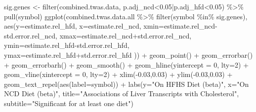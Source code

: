 \documentclass[
]{article}
\newenvironment{Shaded}{\begin{snugshade}}{\end{snugshade}}
\newcommand{\AttributeTok}[1]{\textcolor[rgb]{0.77,0.63,0.00}{#1}}
\newcommand{\DecValTok}[1]{\textcolor[rgb]{0.00,0.00,0.81}{#1}}
\newcommand{\FloatTok}[1]{\textcolor[rgb]{0.00,0.00,0.81}{#1}}
\newcommand{\FunctionTok}[1]{\textcolor[rgb]{0.00,0.00,0.00}{#1}}
\newcommand{\NormalTok}[1]{#1}
\newcommand{\OtherTok}[1]{\textcolor[rgb]{0.56,0.35,0.01}{#1}}
\newcommand{\SpecialCharTok}[1]{\textcolor[rgb]{0.00,0.00,0.00}{#1}}
\newcommand{\StringTok}[1]{\textcolor[rgb]{0.31,0.60,0.02}{#1}}
\begin{document}
\begin{Shaded}
\begin{Highlighting}[]
\NormalTok{sig.genes }\OtherTok{\textless{}{-}} \FunctionTok{filter}\NormalTok{(combined.twas.data, p.adj\_ncd}\SpecialCharTok{\textless{}}\FloatTok{0.05}\SpecialCharTok{|}\NormalTok{p.adj\_hfd}\SpecialCharTok{\textless{}}\FloatTok{0.05}\NormalTok{) }\SpecialCharTok{\%\textgreater{}\%} \FunctionTok{pull}\NormalTok{(symbol)}
\FunctionTok{ggplot}\NormalTok{(combined.twas.data.all }\SpecialCharTok{\%\textgreater{}\%} \FunctionTok{filter}\NormalTok{(symbol }\SpecialCharTok{\%in\%}\NormalTok{ sig.genes), }
       \FunctionTok{aes}\NormalTok{(}\AttributeTok{y=}\NormalTok{estimate.rel\_hfd, }\AttributeTok{x=}\NormalTok{estimate.rel\_ncd,}
           \AttributeTok{xmin=}\NormalTok{estimate.rel\_ncd}\SpecialCharTok{{-}}\NormalTok{std.error.rel\_ncd,}
           \AttributeTok{xmax=}\NormalTok{estimate.rel\_ncd}\SpecialCharTok{+}\NormalTok{std.error.rel\_ncd,}
           \AttributeTok{ymin=}\NormalTok{estimate.rel\_hfd}\SpecialCharTok{{-}}\NormalTok{std.error.rel\_hfd,}
           \AttributeTok{ymax=}\NormalTok{estimate.rel\_hfd}\SpecialCharTok{+}\NormalTok{std.error.rel\_hfd )) }\SpecialCharTok{+}
  \FunctionTok{geom\_point}\NormalTok{() }\SpecialCharTok{+}
  \FunctionTok{geom\_errorbar}\NormalTok{() }\SpecialCharTok{+}
  \FunctionTok{geom\_errorbarh}\NormalTok{() }\SpecialCharTok{+}
  \FunctionTok{geom\_smooth}\NormalTok{() }\SpecialCharTok{+}
  \FunctionTok{geom\_hline}\NormalTok{(}\AttributeTok{yintercept =} \DecValTok{0}\NormalTok{, }\AttributeTok{lty=}\DecValTok{2}\NormalTok{) }\SpecialCharTok{+}
  \FunctionTok{geom\_vline}\NormalTok{(}\AttributeTok{xintercept =} \DecValTok{0}\NormalTok{, }\AttributeTok{lty=}\DecValTok{2}\NormalTok{) }\SpecialCharTok{+}
  \FunctionTok{xlim}\NormalTok{(}\SpecialCharTok{{-}}\FloatTok{0.03}\NormalTok{,}\FloatTok{0.03}\NormalTok{) }\SpecialCharTok{+}
  \FunctionTok{ylim}\NormalTok{(}\SpecialCharTok{{-}}\FloatTok{0.03}\NormalTok{,}\FloatTok{0.03}\NormalTok{) }\SpecialCharTok{+}
  \FunctionTok{geom\_text\_repel}\NormalTok{(}\FunctionTok{aes}\NormalTok{(}\AttributeTok{label=}\NormalTok{symbol)) }\SpecialCharTok{+}
  \FunctionTok{labs}\NormalTok{(}\AttributeTok{y=}\StringTok{"On HFHS Diet (beta)"}\NormalTok{,}
       \AttributeTok{x=}\StringTok{"On NCD Diet (beta)"}\NormalTok{,}
       \AttributeTok{title=}\StringTok{"Associations of Liver Transcripts with Cholesterol"}\NormalTok{,}
       \AttributeTok{subtitle=}\StringTok{"Significant for at least one diet"}\NormalTok{)}
\end{Highlighting}
\end{Shaded}
\end{document}
